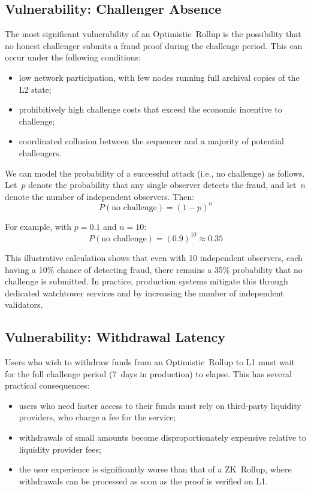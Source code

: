 \documentclass[
]{elteikthesis}[2024/04/26]
\begin{document}
\subsection{Vulnerability: Challenger Absence}

The most significant vulnerability of an Optimistic~Rollup is the possibility that no honest challenger submits a fraud proof during the challenge period. This can occur under the following conditions:
\begin{itemize}
    \item low network participation, with few nodes running full archival copies of the L2 state;
    \item prohibitively high challenge costs that exceed the economic incentive to challenge;
    \item coordinated collusion between the sequencer and a majority of potential challengers.
\end{itemize}

We can model the probability of a successful attack (i.e., no challenge) as follows. Let~$p$ denote the probability that any single observer detects the fraud, and let~$n$ denote the number of independent observers. Then:
\begin{equation}
P(\text{no challenge}) = (1 - p)^n
\end{equation}

For example, with $p = 0.1$ and $n = 10$:
\begin{equation}
P(\text{no challenge}) = (0.9)^{10} \approx 0.35
\end{equation}

This illustrative calculation shows that even with 10 independent observers, each having a 10\% chance of detecting fraud, there remains a 35\% probability that no challenge is submitted. In practice, production systems mitigate this through dedicated watchtower services and by increasing the number of independent validators.

\subsection{Vulnerability: Withdrawal Latency}

Users who wish to withdraw funds from an Optimistic~Rollup to L1 must wait for the full challenge period (7~days in production) to elapse. This has several practical consequences:
\begin{itemize}
    \item users who need faster access to their funds must rely on third-party liquidity providers, who charge a fee for the service;
    \item withdrawals of small amounts become disproportionately expensive relative to liquidity provider fees;
    \item the user experience is significantly worse than that of a ZK~Rollup, where withdrawals can be processed as soon as the proof is verified on L1.
\end{itemize}
\end{document}
